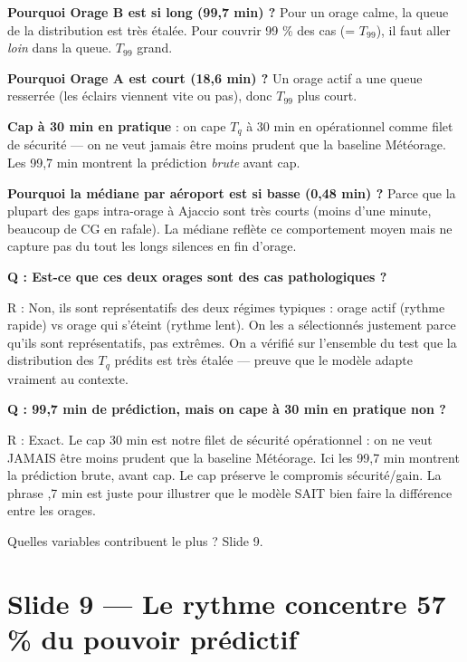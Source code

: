 \documentclass[11pt,a4paper]{article}
\begin{document}
\begin{compr}
\textbf{Pourquoi Orage B est si long (99,7 min) ?} Pour un orage calme, la queue de la
distribution est très étalée. Pour couvrir 99 \% des cas (= $T_{99}$), il faut aller
\emph{loin} dans la queue. $T_{99}$ grand.

\textbf{Pourquoi Orage A est court (18,6 min) ?} Un orage actif a une queue resserrée
(les éclairs viennent vite ou pas), donc $T_{99}$ plus court.

\textbf{Cap à 30 min en pratique} : on cape $T_q$ à 30 min en opérationnel comme filet
de sécurité — on ne veut jamais être moins prudent que la baseline Météorage. Les 99,7 min
montrent la prédiction \emph{brute} avant cap.

\textbf{Pourquoi la médiane par aéroport est si basse (0,48 min) ?} Parce que la plupart
des gaps intra-orage à Ajaccio sont très courts (moins d'une minute, beaucoup de CG en
rafale). La médiane reflète ce comportement moyen mais ne capture pas du tout les longs
silences en fin d'orage.
\end{compr}

\begin{piege}
\textbf{Q : Est-ce que ces deux orages sont des cas pathologiques ?}

R : Non, ils sont représentatifs des deux régimes typiques : orage actif (rythme rapide)
vs orage qui s'éteint (rythme lent). On les a sélectionnés justement parce qu'ils sont
représentatifs, pas extrêmes. On a vérifié sur l'ensemble du test que la distribution
des $T_q$ prédits est très étalée — preuve que le modèle adapte vraiment au contexte.

\textbf{Q : 99,7 min de prédiction, mais on cape à 30 min en pratique non ?}

R : Exact. Le cap 30 min est notre filet de sécurité opérationnel : on ne veut JAMAIS
être moins prudent que la baseline Météorage. Ici les 99,7 min montrent la prédiction
brute, avant cap. Le cap préserve le compromis sécurité/gain. La phrase ,7 min \fg{}
est juste pour illustrer que le modèle SAIT bien faire la différence entre les orages.
\end{piege}

\begin{transit}
\og Quelles variables contribuent le plus ? Slide 9. \fg{}
\end{transit}

\section{Slide 9 — Le rythme concentre 57 \% du pouvoir prédictif}
\end{document}

